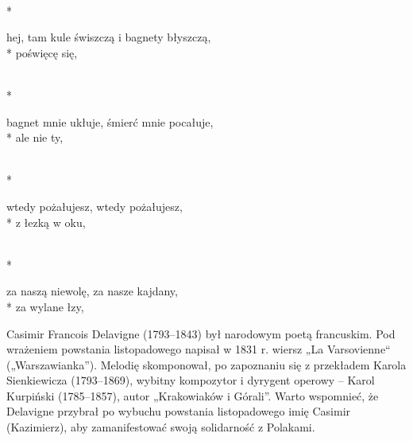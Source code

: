 \begin{lyrics}[longestline={hej, tam kule świszczą i bagnety błyszczą,}]
\\*
\begin{markverses}[marktext={bis}]%
hej, tam kule świszczą i bagnety błyszczą,\\*
poświęcę się,
\end{markverses}

\\*
\begin{markverses}[marktext={bis}]%
bagnet mnie ukłuje, śmierć mnie pocałuje,\\*
ale nie ty,
\end{markverses}

\\*
\begin{markverses}[marktext={bis}]%
wtedy pożałujesz, wtedy pożałujesz,\\*
z łezką w oku,
\end{markverses}

\\*
\begin{markverses}[marktext={bis}]%
za naszą niewolę, za nasze kajdany,\\*
za wylane łzy,
\end{markverses}
\end{lyrics}



\begin{info}Casimir Francois Delavigne (1793–1843) był narodowym poetą francuskim. Pod wrażeniem powstania listopadowego napisał w 1831 r. wiersz „La Varsovienne“ („Warszawianka”). Melodię skomponował, po zapoznaniu się z przekładem Karola Sienkiewicza (1793–1869), wybitny kompozytor i dyrygent operowy – Karol Kurpiński (1785–1857), autor „Krakowiaków i Górali”. Warto wspomnieć, że Delavigne przybrał po wybuchu powstania listopadowego imię Casimir (Kazimierz), aby zamanifestować swoją solidarność z Polakami.\end{info}

